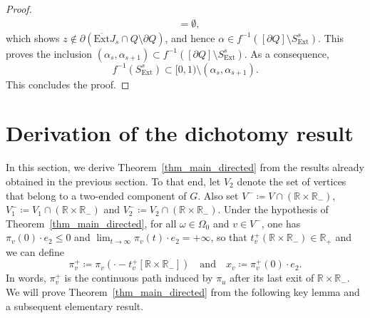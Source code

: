 \documentclass[a4paper, 11pt]{article} %
\theoremstyle{plain}
\newcommand{\Ext}{\mathrm{Ext}}
\newcommand{\clExt}{\overline{\mathrm{Ext}}}
\newcommand{\R}{\mathbb{R}}
\newcommand{\1}{\mathds 1}
\numberwithin{equation}{section}
\begin{document}
\begin{proof}
\begin{equation*}
\begin{split}
                &=\emptyset,
            \end{split}
        \end{equation*}
    which shows $z\notin\partial (\clExt J_s\cap Q\setminus \partial Q)$, and hence $\alpha\in f^{-1}([\partial Q]\setminus S_\Ext^s)$. This proves the inclusion $(\alpha_s, \alpha_{s+1})\subset f^{-1}([\partial Q]\setminus S_\Ext^s)$. As a consequence,
        \begin{equation*}
            \label{eq_S_ext}
            f^{-1}(S_\Ext^s)\subset[0,1)\setminus (\alpha_s, \alpha_{s+1}).
        \end{equation*}
    This concludes the proof.
\end{proof}



\section{Derivation of the dichotomy result}

\label{section_protected_paths}


In this section, we derive Theorem~\ref{thm_main_directed} from the results already obtained in the previous section. To that end, let $V_2$ denote the set of vertices that belong to a two-ended component of $G$. Also set $V^-\coloneq V\cap(\R\times\R_-)$, $V_1^-\coloneq V_1\cap(\R\times\R_-)$ and $V_2^-\coloneq V_2\cap(\R\times\R_-)$. Under the hypothesis of Theorem~\ref{thm_main_directed}, for all $\omega\in\Omega_0$ and $v\in V^-$, one has $\pi_v(0)\cdot e_2\leq 0$ and $\lim_{t\to\infty}\pi_v(t)\cdot e_2=+\infty$, so that $t^+_v(\R\times\R_-)\in\R_+$ and we can define
    \[\pi_v^+\coloneq\pi_v(\cdot - t^+_v[\R\times\R_-])\quad\text{and}\quad x_v\coloneqq \pi_v^+(0)\cdot e_2.\]
In words, $\pi_v^+$ is the continuous path induced by $\pi_u$ after its last exit of $\R\times\R_-$. We will prove Theorem~\ref{thm_main_directed} from the following key lemma and a subsequent elementary result.
\end{document}
